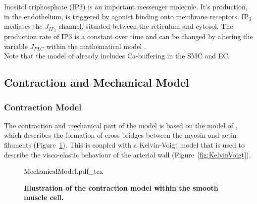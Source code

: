 Inositol triphosphate (\gls{IP3}) is an important messenger molecule. It's production, in the endothelium, is triggered by agonist binding onto membrane receptors. IP$_3$ mediates the $ J_{IP_3} $ channel, situated between the reticulum and cytosol. 
The production rate of IP3 is a constant over time and can be changed by altering the variable  $ J_{PLC}$ within the mathematical model .\\

Note that the model of \citet{Koenigsberger2006} already includes \gls{Ca}-buffering in the SMC and EC.











\subsection{Contraction and Mechanical Model}

\subsubsection{Contraction Model}
The contraction and mechanical part of the model is based on the model of \citet{Hai1989}, which describes the formation of cross bridges between the myosin and actin filaments (Figure~\ref{fig:MechModell}). This is coupled with a Kelvin-Voigt model that is used to describe the visco-elastic behaviour of the arterial wall (Figure~\ref{fig:KelvinVoigt}).\\
\begin{figure}[h!]
  \centering
  \def\svgwidth{450pt} %
  \footnotesize
  {MechanicalModel.pdf_tex}
  \caption{\textbf{Illustration of the contraction model within the smooth muscle cell. }}
\label{fig:MechModell}
\end{figure}


